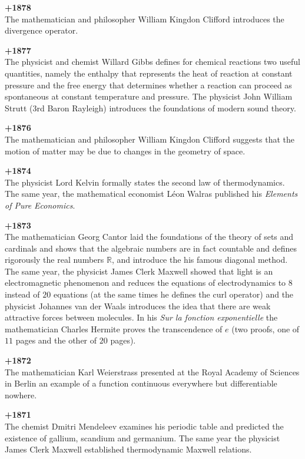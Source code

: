 \textbf{+1878}\\
The mathematician and philosopher William Kingdon Clifford introduces the divergence operator.

\textbf{+1877}\\
The physicist and chemist Willard Gibbs defines for chemical reactions two useful quantities, namely the enthalpy that represents the heat of reaction at constant pressure and the free energy that determines whether a reaction can proceed as spontaneous at constant temperature and pressure. The physicist John William Strutt (3rd Baron Rayleigh) introduces the foundations of modern sound theory. 

\textbf{+1876}\\
The mathematician and philosopher William Kingdon Clifford suggests that the motion of matter may be due to changes in the geometry of space.

\textbf{+1874}\\
The physicist Lord Kelvin formally states the second law of thermodynamics. The same year, the mathematical economist Léon Walras published his \textit{Elements of Pure Economics}.

\textbf{+1873}\\
The mathematician Georg Cantor laid the foundations of the theory of sets and cardinals and shows that the algebraic numbers are in fact countable and defines rigorously the real numbers $\mathbb{R}$, and introduce the his famous diagonal method. The same year, the physicist James Clerk Maxwell showed that light is an electromagnetic phenomenon and reduces the equations of electrodynamics to $8$ instead of $20$ equations (at the same times he defines the curl operator) and the physicist Johannes van der Waals introduces the idea that there are weak attractive forces between molecules. In his \textit{Sur la fonction exponentielle} the mathematician Charles Hermite proves the transcendence of $e$ (two proofs, one of $11$ pages and the other of $20$ pages).

\textbf{+1872}\\
The mathematician Karl Weierstrass presented at the Royal Academy of Sciences in Berlin an example of a function continuous everywhere but differentiable nowhere.

\textbf{+1871}\\
The chemist Dmitri Mendeleev examines his periodic table and predicted the existence of gallium, scandium and germanium. The same year the physicist James Clerk Maxwell established thermodynamic Maxwell relations. 

